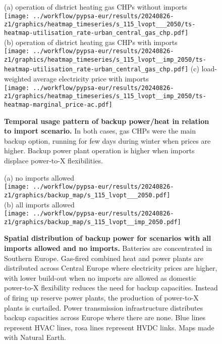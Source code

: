 \begin{figure*}
    \centering
    \footnotesize
    (a) operation of district heating gas CHPs without imports  \\
    \texttt{[image: ../workflow/pypsa-eur/results/20240826-z1/graphics/heatmap\_timeseries/s\_115\_lvopt\_\_\_2050/ts-heatmap-utilisation\_rate-urban\_central\_gas\_chp.pdf]} \\
    (b) operation of district heating gas CHPs with imports \\
    \texttt{[image: ../workflow/pypsa-eur/results/20240826-z1/graphics/heatmap\_timeseries/s\_115\_lvopt\_\_imp\_2050/ts-heatmap-utilisation\_rate-urban\_central\_gas\_chp.pdf]}
    (c) load-weighted average electricity price with imports \\
    \texttt{[image: ../workflow/pypsa-eur/results/20240826-z1/graphics/heatmap\_timeseries/s\_115\_lvopt\_\_imp\_2050/ts-heatmap-marginal\_price-ac.pdf]}
    \caption{\textbf{Temporal usage pattern of backup power/heat in relation to
    import scenario.} In both cases, gas CHPs were the main backup option,
    running for few days during winter when prices are higher. Backup power
    plant operation is higher when imports displace power-to-X flexibilities.}
    \label{fig:si:backup-power}
\end{figure*}

\begin{figure*}
    \centering
    \footnotesize
    (a) no imports allowed  \\
    \texttt{[image: ../workflow/pypsa-eur/results/20240826-z1/graphics/backup\_map/s\_115\_lvopt\_\_\_2050.pdf]} \\
    (b) all imports allowed \\
    \texttt{[image: ../workflow/pypsa-eur/results/20240826-z1/graphics/backup\_map/s\_115\_lvopt\_\_imp\_2050.pdf]}
    \caption{\textbf{Spatial distribution of backup power for scenarios with all
    imports allowed and no imports.} Batteries are concentrated in Southern
    Europe. Gas-fired combined heat and power plants are distributed across
    Central Europe where electricity prices are higher, with lower build-out
    when no imports are allowed as domestic power-to-X flexibility reduces the
    need for backup capacities. Instead of firing up reserve power plants, the
    production of power-to-X plants is curtailed. Power transmission
    infrastructure distributes backup capacities across Europe where there are none.
    Blue lines represent HVAC lines, rosa lines represent HVDC links.  Maps made with Natural Earth.}
    \label{fig:si:backup-power-map}
\end{figure*}


